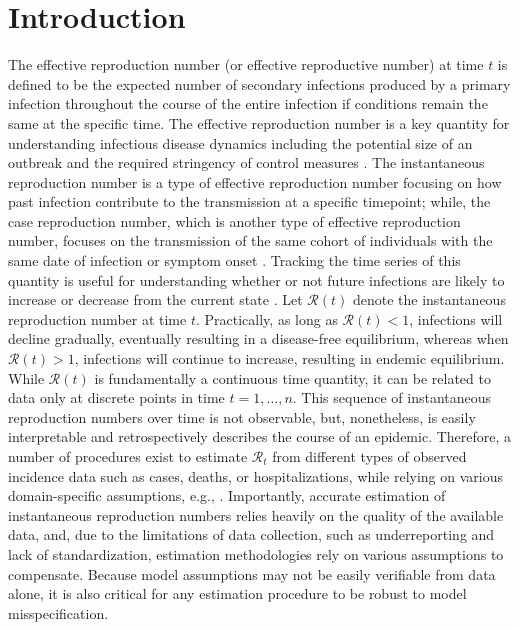 \documentclass[10pt,letterpaper]{article}
\def\calR{\mathcal{R}}
\begin{document}
\linenumbers

\section{Introduction}
\label{sec:intro}

The effective reproduction number (or effective reproductive number) at time
$\textit{t}$ is defined to be the expected number of secondary infections
produced by a primary infection throughout the course of the entire infection if
conditions remain the same at the specific time. The effective reproduction number
is a key quantity for understanding infectious disease dynamics including the
potential size of an outbreak and the required stringency of control measures
\cite{nishiura2009effective,fraser2007estimating}. The instantaneous
reproduction number is a type of effective reproduction number focusing on how
past infection contribute to the transmission at a specific timepoint; while,
the case reproduction number, which is another type of effective reproduction
number, focuses on the transmission of the same cohort of individuals with the
same date of infection or symptom onset \cite{gostic2020practical}. Tracking the
time series of this quantity is useful for understanding whether or not future
infections are likely to increase or decrease from the current state
\cite{anderson1991infectious}. Let $\calR(t)$ denote the instantaneous
reproduction number at time $t$. Practically, as long as $\calR(t) < 1$,
infections will decline gradually, eventually resulting in a disease-free
equilibrium, whereas when $\calR(t) > 1$, infections will continue to increase,
resulting in endemic equilibrium. While $\calR(t)$ is fundamentally a continuous
time quantity, it can be related to data only at discrete points in time $t =
1,\ldots,n$. This sequence of instantaneous reproduction numbers over time is
not observable, but, nonetheless, is easily interpretable and retrospectively
describes the course of an epidemic. Therefore, a number of procedures exist to
estimate $\calR_t$ from different types of observed incidence data such as
cases, deaths, or hospitalizations, while relying on various domain-specific
assumptions, e.g.,
\cite{wallinga2004different,hao2020reconstruction,goldstein2023semiparametric,goldstein2024incorporating}.
Importantly, accurate estimation of instantaneous reproduction numbers relies
heavily on the quality of the available data, and, due to the limitations of
data collection, such as underreporting and lack of standardization, estimation
methodologies rely on various assumptions to compensate. Because model
assumptions may not be easily verifiable from data alone, it is also critical
for any estimation procedure to be robust to model misspecification. 
\end{document}
